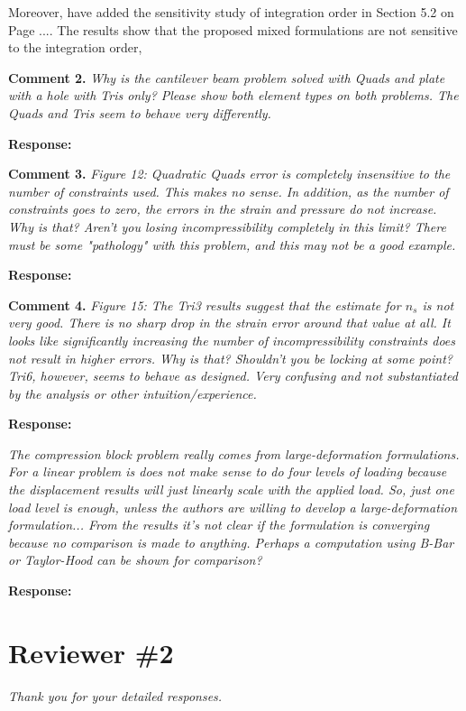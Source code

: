 \documentclass{article}
\begin{document}
Moreover, have added the sensitivity study of integration order in Section 5.2 on Page ....
The results show that the proposed mixed formulations are not sensitive to the integration order,


\textbf{Comment 2.} \textit{Why is the cantilever beam problem solved with Quads and plate with a hole with Tris only? Please show both element types on both problems. The Quads and Tris seem to behave very differently.}

\textbf{Response:}

\textbf{Comment 3.} \textit{Figure 12: Quadratic Quads error is completely insensitive to the number of constraints used. This makes no sense. In addition, as the number of constraints goes to zero, the errors in the strain and pressure do not increase. Why is that? Aren't you losing incompressibility completely in this limit? There must be some "pathology" with this problem, and this may not be a good example.}

\textbf{Response:} 

\textbf{Comment 4.} \textit{
Figure 15:
The Tri3 results suggest that the estimate for $n_s$ is not very good. There is no sharp drop in the strain error around that value at all.
It looks like significantly increasing the number of incompressibility constraints does not result in higher errors.
Why is that? Shouldn't you be locking at some point? Tri6, however, seems to behave as designed. Very confusing and not substantiated by the analysis or other intuition/experience.
}

\textbf{Response:}

\textit{The compression block problem really comes from large-deformation formulations. For a linear problem is does not make sense to do four levels of loading because the displacement results will just linearly scale with the applied load. So, just one load level is enough, unless the authors are willing to develop a large-deformation formulation... From the results it's not clear if the formulation is converging because no comparison is made to anything. Perhaps a computation using B-Bar or Taylor-Hood can be shown for comparison?}

\textbf{Response:} 

\section*{Reviewer \#2}

\textit{Thank you for your detailed responses.}
\end{document}
